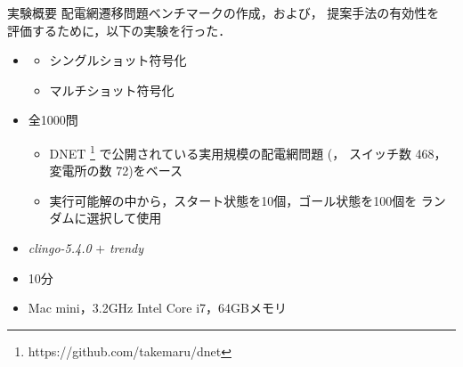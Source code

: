 \documentclass[dvipdfmx,11pt]{beamer}
\begin{document}
\begin{frame}{実験概要}
  \renewcommand{\thefootnote}{\fnsymbol{footnote}}
  \setcounter{footnote}{1}
 配電網遷移問題ベンチマークの作成，および，
 提案手法の有効性を\\評価するために，以下の実験を行った．
  \vfill
  \begin{itemize}
  \item {}
    \begin{itemize}
    \item シングルショット符号化
    \item マルチショット符号化
    \end{itemize}
  \item {} 全1000問
    \begin{itemize}
    \item DNET \footnote{https://github.com/takemaru/dnet}
      で公開されている実用規模の配電網問題 (，
      スイッチ数 468，変電所の数 72)をベース
    \item 実行可能解の中から，スタート状態を10個，ゴール状態を100個を
          ランダムに選択して使用
    \end{itemize}
  \item {} \textit{clingo-5.4.0} $+$ \textit{trendy}
   \item {} 10分
  \item {} Mac mini，3.2GHz Intel Core i7，64GBメモリ
  \end{itemize}
\end{frame}
\end{document}
